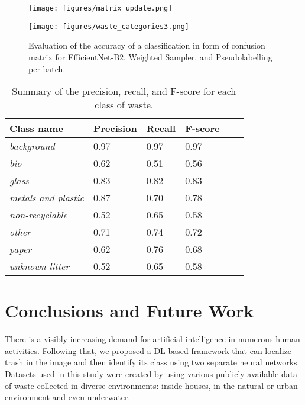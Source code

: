 \documentclass{article}
\begin{document}
\begin{figure}[htb]
    \begin{minipage}[c]{.55\textwidth}
        \centering
        \texttt{[image: figures/matrix\_update.png]}
    \end{minipage}
    \hfill
    \begin{minipage}[c]{.35\textwidth}
        \centering
        \texttt{[image: figures/waste\_categories3.png]}
    \end{minipage}
    \caption{Evaluation of the accuracy of a classification in form of confusion matrix for EfficientNet-B2, Weighted Sampler, and Pseudolabelling per batch. \label{fig:conf_matrix}}
\end{figure}


\begin{table}[!ht]
    \centering
    \caption{Summary of the precision, recall, and F-score for each class of waste.}
    \label{tab:classifcation_report}
    \begin{tabular}{llllll}
    \hline
        \textbf{Class name} & \textbf{Precision} & \textbf{Recall} & \textbf{F-score} \\ \hline
            \textit{background} & 0.97 & 0.97 & 0.97 \\
            \textit{bio} & 0.62 & 0.51 & 0.56 \\
            \textit{glass} & 0.83 & 0.82 & 0.83 \\
            \textit{metals and plastic} & 0.87 & 0.70 & 0.78 \\
            \textit{non-recyclable} & 0.52 & 0.65 & 0.58 \\
            \textit{other} & 0.71 & 0.74 & 0.72 \\
            \textit{paper} & 0.62 & 0.76 & 0.68 \\
            \textit{unknown litter} & 0.52 & 0.65 & 0.58 \\ \hline
    \end{tabular}
\end{table}

 
\newpage
\section{Conclusions and Future Work}
\label{sec:conclusions}

There is a visibly increasing demand for artificial intelligence in numerous human activities. Following that, we proposed a DL-based framework that can localize trash in the image and then identify its class using two separate neural networks. Datasets used in this study were created by using various publicly available data of waste collected in diverse environments: inside houses, in the natural or urban environment and even underwater.
\end{document}
